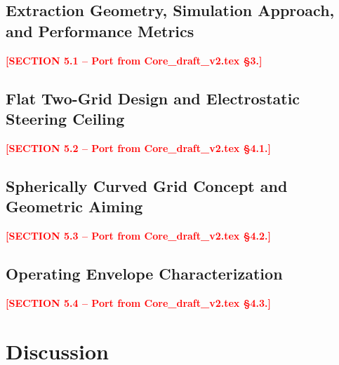 \documentclass[]{interact}
\newcommand{\INSERT}[1]{\textcolor{red}{\textbf{[#1]}}}
\begin{document}
\subsection{Extraction Geometry, Simulation Approach, and Performance Metrics}
\label{sec:methods}

\INSERT{SECTION 5.1 -- Port from Core\_draft\_v2.tex \S3.}

\subsection{Flat Two-Grid Design and Electrostatic Steering Ceiling}
\label{sec:results-steering}

\INSERT{SECTION 5.2 -- Port from Core\_draft\_v2.tex \S4.1.}

\subsection{Spherically Curved Grid Concept and Geometric Aiming}
\label{sec:results-curved}

\INSERT{SECTION 5.3 -- Port from Core\_draft\_v2.tex \S4.2.}

\subsection{Operating Envelope Characterization}
\label{sec:results-envelope}

\INSERT{SECTION 5.4 -- Port from Core\_draft\_v2.tex \S4.3.}


\section{Discussion}
\label{sec:discussion}
\end{document}

